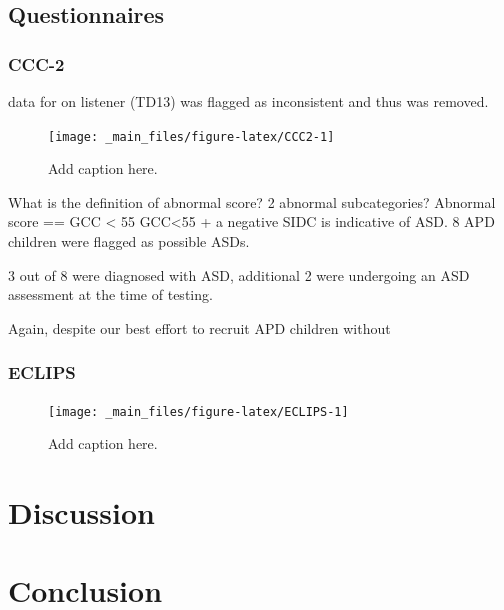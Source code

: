 \documentclass[a4paper, twoside]{templates/ociamthesis}
\begin{document}
\hypertarget{questionnaires-1}{%
\subsection{Questionnaires}\label{questionnaires-1}}

\hypertarget{ccc-2}{%
\subsubsection{CCC-2}\label{ccc-2}}

data for on listener (TD13) was flagged as inconsistent and thus was removed.

\begin{figure}

{\centering \texttt{[image: \_main\_files/figure-latex/CCC2-1]} 

}

\caption{Add caption here.}\label{fig:CCC2}
\end{figure}

What is the definition of abnormal score? 2 abnormal subcategories?
Abnormal score == GCC \textless{} 55
GCC\textless55 + a negative SIDC is indicative of ASD. 8 APD children were flagged as possible ASDs.

3 out of 8 were diagnosed with ASD, additional 2 were undergoing an ASD assessment at the time of testing.

Again, despite our best effort to recruit APD children without

\hypertarget{eclips}{%
\subsubsection{ECLIPS}\label{eclips}}

\begin{figure}

{\centering \texttt{[image: \_main\_files/figure-latex/ECLIPS-1]} 

}

\caption{Add caption here.}\label{fig:ECLIPS}
\end{figure}

\hypertarget{discussion-4}{%
\section{Discussion}\label{discussion-4}}

\hypertarget{conclusion-2}{%
\section{Conclusion}\label{conclusion-2}}
\end{document}
